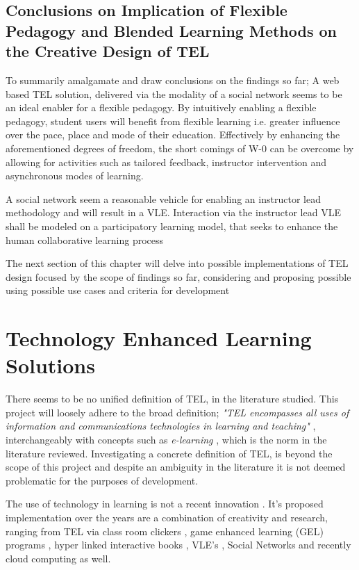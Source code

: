 \subsection{Conclusions on Implication of Flexible Pedagogy and Blended Learning Methods on the Creative Design of TEL}
\label{subsec:subsec01}

To summarily amalgamate and draw conclusions on the findings so far; A  web based TEL solution, delivered via the modality of a social network seems to be an  ideal enabler for a flexible pedagogy. By intuitively enabling a flexible pedagogy, student users will benefit from flexible learning i.e. greater influence over the pace, place and mode of their education. Effectively by enhancing the aforementioned degrees of freedom, the short comings of W-0 can be overcome by allowing for activities such as tailored feedback, instructor intervention and asynchronous modes of learning.

A social network seem a reasonable vehicle for enabling an instructor lead methodology and will result in a VLE. Interaction via the instructor lead VLE shall be modeled on a participatory learning model, that seeks to enhance the human collaborative learning process \cite{Yager1990,Yager2004}

The next section of this chapter will delve into possible implementations of TEL design focused by the scope of findings so far, considering and proposing possible using possible use cases and criteria for development

\newpage
\section{Technology Enhanced Learning Solutions}
\label{sec:sec01}

There seems to be no unified definition of TEL, in the literature studied. This project will loosely adhere to the broad definition; \textit { "TEL encompasses all uses of information and communications technologies in learning and teaching"} \cite{Project2009}, interchangeably with concepts such as \textit{e-learning} \cite{Gordon2014}, which is the norm in the literature reviewed. Investigating a concrete definition of TEL, is beyond the scope of this project and despite an ambiguity in the literature it is not deemed problematic for the purposes of development. 

The use of technology in learning is not a recent innovation \cite{Serrano-Laguna2015,TechFacultyinnovate.utexas.edu,Harger1996}. It's proposed implementation over the years are a combination of creativity and research, ranging from TEL via class room clickers \cite{Hatziapostolou2014},  game enhanced learning (GEL) programs \cite{Serrano-Laguna2015,Ibanez2014}, hyper linked interactive books  \cite{Harger1996}, VLE's \cite{Gordon2014,Richmond2005,Burge2011}, Social Networks \cite{Burge2011,Cubukcuo2012} and recently cloud computing \cite{Burge2011} as well.

